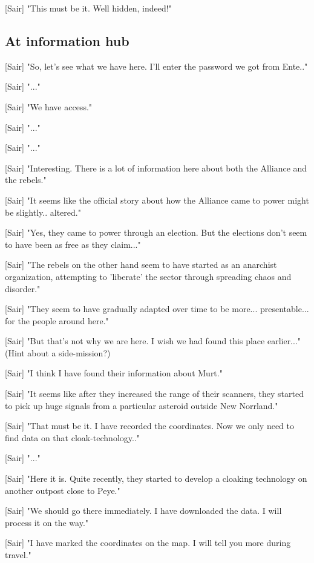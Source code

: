 \documentclass[a4paper,12pt]{article}
\begin{document}
[Sair] "This must be it. Well hidden, indeed!"

\subsection{At information hub}

[Sair] "So, let's see what we have here. I'll enter the password we got from Ente.."

[Sair] "..."

[Sair] "We have access."

[Sair] "..."

[Sair] "..."

[Sair] "Interesting. There is a lot of information here about both the Alliance and the rebels."

[Sair] "It seems like the official story about how the Alliance came to power might be slightly.. altered."

[Sair] "Yes, they came to power through an election. But the elections don't seem to have been as free as they claim..."

[Sair] "The rebels on the other hand seem to have started as an anarchist organization, attempting to 'liberate' the sector
through spreading chaos and disorder."

[Sair] "They seem to have gradually adapted over time to be more... presentable... for the people around here."

[Sair] "But that's not why we are here. I wish we had found this place earlier..." (Hint about a side-mission?)

[Sair] "I think I have found their information about Murt."

[Sair] "It seems like after they increased the range of their scanners, they started to pick up huge signals from a particular asteroid outside New Norrland."

[Sair] "That must be it. I have recorded the coordinates. Now we only need to find data on that cloak-technology.."

[Sair] "..."

[Sair] "Here it is. Quite recently, they started to develop a cloaking technology on another outpost close to Peye."

[Sair] "We should go there immediately. I have downloaded the data. I will process it on the way."

[Sair] "I have marked the coordinates on the map. I will tell you more during travel."
\end{document}
